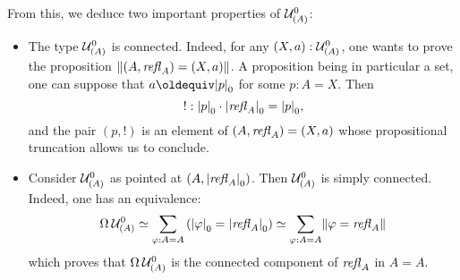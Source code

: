 From this, we deduce two important properties of ${{{\mathcal{U}}}^0_{\left(A\right)}}$:
\begin{itemize}
\item The type ${{{\mathcal{U}}}^0_{\left(A\right)}}$ is connected. Indeed, for any
  $(X,a):{{{\mathcal{U}}}^0_{\left(A\right)}}$, one wants to prove the proposition
  $\lVert(A,\mathop{\mathit{refl}_{A}}) = (X,a)\rVert$. A proposition being in particular a
  set, one can suppose that $a\jdeq \settrunc p$ for some
  $p:A=X$. Then
  \begin{displaymath}
    !:{\lvert p\rvert}_0 \cdot {\lvert\mathop{\mathit{refl}_{A}}\rvert}_0 = {\lvert p\rvert}_0,
  \end{displaymath}
  and the pair $(p,!)$ is an element of $(A,\mathop{\mathit{refl}_{A}}) = (X,a)$ whose
  propositional truncation allows us to conclude.
\item Consider ${{{\mathcal{U}}}^0_{\left(A\right)}}$ as pointed at
  $(A,{\lvert\mathop{\mathit{refl}_{A}}\rvert}_0)$. Then ${{{\mathcal{U}}}^0_{\left(A\right)}}$ is simply
  connected. Indeed, one has an equivalence:
  \begin{displaymath}
    \loopspace {\univcover\UU A} 
    \weq \sum_{\varphi:A=A}\left( \settrunc{\varphi} = \settrunc{\refl A}\right)
    \weq \sum_{\varphi:A=A}\Trunc{\varphi = \refl A}
  \end{displaymath}
  which proves that $\loopspace {\univcover\UU A}$ is the connected
  component of $\mathop{\mathit{refl}_{A}}$ in $A=A$. 
\end{itemize}

